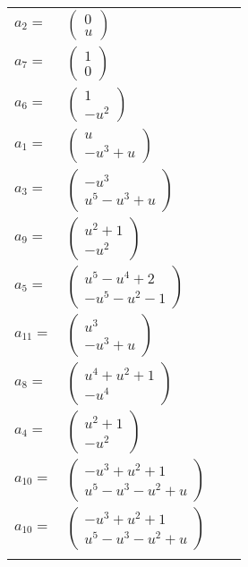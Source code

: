 \documentclass[1p]{elsarticle_modified}
\theoremstyle{definition}
\begin{document}
\begin{tabular}{m{7pt} m{180pt} m{7pt} m{180pt} }
\flushright $a_{2}=$&$\begin{pmatrix}0\\u\end{pmatrix}$ \\
\flushright $a_{7}=$&$\begin{pmatrix}1\\0\end{pmatrix}$ \\
\flushright $a_{6}=$&$\begin{pmatrix}1\\- u^2\end{pmatrix}$ \\
\flushright $a_{1}=$&$\begin{pmatrix}u\\- u^3+u\end{pmatrix}$ \\
\flushright $a_{3}=$&$\begin{pmatrix}- u^3\\u^5- u^3+u\end{pmatrix}$ \\
\flushright $a_{9}=$&$\begin{pmatrix}u^2+1\\- u^2\end{pmatrix}$ \\
\flushright $a_{5}=$&$\begin{pmatrix}u^5- u^4+2\\- u^5- u^2-1\end{pmatrix}$ \\
\flushright $a_{11}=$&$\begin{pmatrix}u^3\\- u^3+u\end{pmatrix}$ \\
\flushright $a_{8}=$&$\begin{pmatrix}u^4+u^2+1\\- u^4\end{pmatrix}$ \\
\flushright $a_{4}=$&$\begin{pmatrix}u^2+1\\- u^2\end{pmatrix}$ \\
\flushright $a_{10}=$&$\begin{pmatrix}- u^3+u^2+1\\u^5- u^3- u^2+u\end{pmatrix}$\\ \flushright $a_{10}=$&$\begin{pmatrix}- u^3+u^2+1\\u^5- u^3- u^2+u\end{pmatrix}$\\&\end{tabular}
\end{document}
